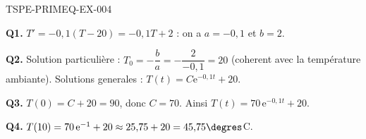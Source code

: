 \begin{corrige}{TSPE-PRIMEQ-EX-004}

\textbf{Q1.} $T' = -0{,}1(T-20) = -0{,}1T + 2$ : on a $a=-0{,}1$ et $b=2$.

\textbf{Q2.} Solution particulière : $T_0 = -\dfrac{b}{a} = -\dfrac{2}{-0{,}1} = 20$ (coherent avec la température ambiante). Solutions generales : $T(t) = C\mathrm{e}^{-0{,}1t}+20$.

\textbf{Q3.} $T(0) = C+20 = 90$, donc $C=70$. Ainsi $T(t) = 70\,\mathrm{e}^{-0{,}1t}+20$.

\textbf{Q4.} $T(10) = 70\,\mathrm{e}^{-1}+20 \approx 25{,}75+20 = 45{,}75\degres$C.

\end{corrige}
